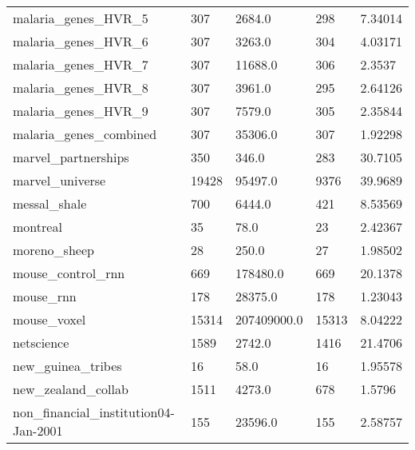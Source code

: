 \begin{longtable}{lllll}
 malaria\_genes\_HVR\_5                                & 307        & 2684.0      & 298   & 7.34014    \\
 malaria\_genes\_HVR\_6                                & 307        & 3263.0      & 304   & 4.03171    \\
 malaria\_genes\_HVR\_7                                & 307        & 11688.0     & 306   & 2.3537     \\
 malaria\_genes\_HVR\_8                                & 307        & 3961.0      & 295   & 2.64126    \\
 malaria\_genes\_HVR\_9                                & 307        & 7579.0      & 305   & 2.35844    \\
 malaria\_genes\_combined                             & 307        & 35306.0     & 307   & 1.92298    \\
 marvel\_partnerships                                & 350        & 346.0       & 283   & 30.7105    \\
 marvel\_universe                                    & 19428      & 95497.0     & 9376  & 39.9689    \\
 messal\_shale                                       & 700        & 6444.0      & 421   & 8.53569    \\
 montreal                                           & 35         & 78.0        & 23    & 2.42367    \\
 moreno\_sheep                                       & 28         & 250.0       & 27    & 1.98502    \\
 mouse\_control\_rnn                                  & 669        & 178480.0    & 669   & 20.1378    \\
 mouse\_rnn                                          & 178        & 28375.0     & 178   & 1.23043    \\
 mouse\_voxel                                        & 15314      & 207409000.0 & 15313 & 8.04222    \\
 netscience                                         & 1589       & 2742.0      & 1416  & 21.4706    \\
 new\_guinea\_tribes                                  & 16         & 58.0        & 16    & 1.95578    \\
 new\_zealand\_collab                                 & 1511       & 4273.0      & 678   & 1.5796     \\
 non\_financial\_institution04-Jan-2001               & 155        & 23596.0     & 155   & 2.58757    \\

\end{longtable}
